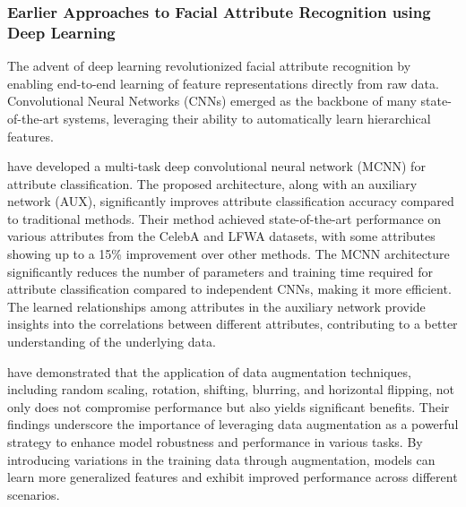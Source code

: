 \documentclass[a4paper,oneside]{article}
\begin{document}
\subsubsection{Earlier Approaches to Facial Attribute Recognition using Deep Learning}
The advent of deep learning revolutionized facial attribute recognition by enabling end-to-end learning of feature representations directly from raw data. Convolutional Neural Networks (CNNs) emerged as the backbone of many state-of-the-art systems, leveraging their ability to automatically learn hierarchical features.

\citet{DBLP:journals/corr/HandC16} have developed a multi-task deep convolutional neural network (MCNN) for attribute classification.
The proposed architecture, along with an auxiliary network (AUX), significantly improves attribute classification accuracy compared to traditional methods.
Their method achieved state-of-the-art performance on various attributes from the CelebA and LFWA datasets, with some attributes showing up to a 15\% improvement over other methods.
The MCNN architecture significantly reduces the number of parameters and training time required for attribute classification compared to independent CNNs, making it more efficient.
The learned relationships among attributes in the auxiliary network provide insights into the correlations between different attributes, contributing to a better understanding of the underlying data.

\citet{DBLP:journals/corr/GuntherRB16} have demonstrated that the application of data augmentation techniques, including random scaling, rotation, shifting, blurring, and horizontal flipping, not only does not compromise performance but also yields significant benefits.
Their findings underscore the importance of leveraging data augmentation as a powerful strategy to enhance model robustness and performance in various tasks.
By introducing variations in the training data through augmentation, models can learn more generalized features and exhibit improved performance across different scenarios.
\end{document}

